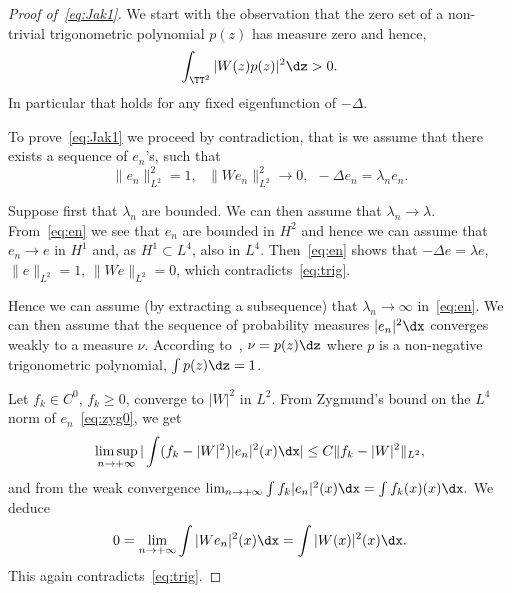 \begin{proof}[Proof of~\eqref{eq:Jak1}]
We start with the observation that the zero set of a non-trivial trigonometric polynomial $ p (z) $ has measure zero and hence,
\begin{equation}\label{eq:trig}
\int_{\TT^2} | W (z) p(z) |^2 \dz > 0.
\end{equation}
In particular that holds for any fixed eigenfunction of $ - \Delta $.

To prove~\eqref{eq:Jak1} we proceed by contradiction, that is we assume that there exists a sequence of $ e_n $'s, such that
\begin{equation}\label{eq:en}
\|e_n \|_{L^2}^2 = 1, \ \ \ \| W e_n \|_{L^2}^2 \rightarrow 0, \ \ - \Delta e_n =
\lambda_n e_n.
\end{equation}

Suppose first that $ \lambda_n $ are bounded. We can then assume that $ \lambda_n \to \lambda $. From~\eqref{eq:en} we see that $ e_n $ are bounded in $ H^2 $ and hence we can assume that $ e_n \to e $ in $ H^1 $ and, as $ H^1 \subset L^4 $, also in $ L^4 $. Then~\eqref{eq:en} shows that $ -\Delta e = \lambda e$, $ \| e\|_{L^2 } = 1 $, $ \| W e \|_{L^2 } = 0$, which contradicts~\eqref{eq:trig}.

Hence we can assume (by extracting a subsequence) that $ \lambda_n \to \infty $ in~\eqref{eq:en}. We can then assume that the sequence of probability measures $ |e_n|^2 \dx $ converges weakly to a measure $\nu$. According to~\cite[Theorem~1.2]{Jak}, $ \nu = p (z) \dz $ where $ p$ is a non-negative trigonometric polynomial, $ \int p (z) \dz = 1 $.

Let $ f_k\in C^0$, $ f_k \geq 0$, converge to $|W|^2 $ in $L^2$. From Zygmund's bound on the $L^4$ norm of $e_n$~\eqref{eq:zyg0}, we get
\[
\limsup_{n\rightarrow + \infty} | \int (f_k - |W |^2)|e_n|^2 (x) \dx | \leq C \| f_k - |W|^2\|_{L^2},
\]
and from the weak convergence $ \lim_{n\rightarrow + \infty} \int f_k|e_n|^2 (x) \dx = \int f_k (x) (x)\dx.$ We deduce
\[
0= \lim_{n\rightarrow + \infty} \int |W e_n|^2 (x) \dx = \int |W (x)|^2 (x)\dx.
\]
This again contradicts~\eqref{eq:trig}.
\end{proof}

